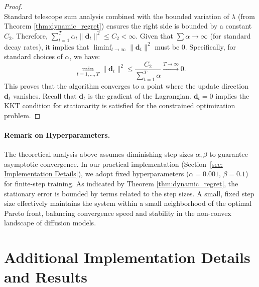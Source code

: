 \begin{proof}
\begin{equation}
\end{equation}
Standard telescope sum analysis combined with the bounded variation of $\lambda$ (from Theorem \ref{thm:dynamic_regret}) ensures the right side is bounded by a constant $C_2$.
Therefore, $\sum_{t=1}^T \alpha_t \|\mathbf{d}_t\|^2 \le C_2 < \infty$. Given that $\sum \alpha \to \infty$ (for standard decay rates), it implies that $\liminf_{t \to \infty} \|\mathbf{d}_t\|^2$ must be 0.
Specifically, for standard choices of $\alpha$, we have:
\begin{equation}
    \min_{t=1,\dots,T} \|\mathbf{d}_t\|^2 \le \frac{C_2}{\sum_{t=1}^T \alpha} \xrightarrow{T \to \infty} 0.
\end{equation}
This proves that the algorithm converges to a point where the update direction $\mathbf{d}_t$ vanishes. Recall that $\mathbf{d}_t$ is the gradient of the Lagrangian. $\mathbf{d}_t = 0$ implies the KKT condition for stationarity is satisfied for the constrained optimization problem.
\end{proof}

\paragraph{Remark on Hyperparameters.}
The theoretical analysis above assumes diminishing step sizes $\alpha, \beta$ to guarantee asymptotic convergence. In our practical implementation (Section~\ref{sec: Implementation Details}), we adopt fixed hyperparameters ($\alpha=0.001$, $\beta=0.1$) for finite-step training. As indicated by Theorem \ref{thm:dynamic_regret}, the stationary error is bounded by terms related to the step sizes. A small, fixed step size effectively maintains the system within a small neighborhood of the optimal Pareto front, balancing convergence speed and stability in the non-convex landscape of diffusion models.



\section{Additional Implementation Details and Results}
\label{appendix: Additional Experimental Details and Results}

